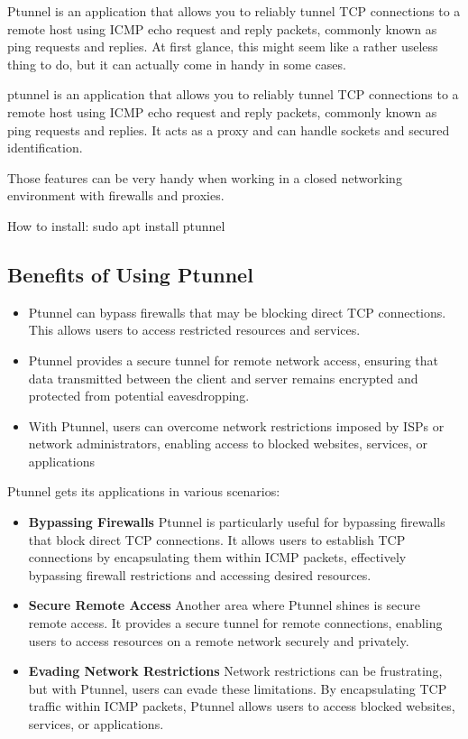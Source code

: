 Ptunnel is an application that allows you to reliably tunnel TCP connections to a remote host using ICMP echo request and reply packets, commonly known as ping requests and replies. At first glance, this might seem like a rather useless thing to do, but it can actually come in handy in some cases.

ptunnel is an application that allows you to reliably tunnel TCP connections to a remote host using ICMP echo request and reply packets, commonly known as ping requests and replies. It acts as a proxy and can handle sockets and secured identification.

Those features can be very handy when working in a closed networking environment with firewalls and proxies.

How to install: sudo apt install ptunnel
%
\subsection{Benefits of Using Ptunnel}
\begin{itemize}
    \item Ptunnel can bypass firewalls that may be blocking direct TCP connections. This allows users to access restricted resources and services.
    \item Ptunnel provides a secure tunnel for remote network access, ensuring that data transmitted between the client and server remains encrypted and protected from potential eavesdropping.
    \item With Ptunnel, users can overcome network restrictions imposed by ISPs or network administrators, enabling access to blocked websites, services, or applications
\end{itemize}
%
Ptunnel gets its applications in various scenarios:
\begin{itemize}
    \item \textbf{Bypassing Firewalls}
    Ptunnel is particularly useful for bypassing firewalls that block direct TCP connections. It allows users to establish TCP connections by encapsulating them within ICMP packets, effectively bypassing firewall restrictions and accessing desired resources.
    \item \textbf{Secure Remote Access} 
    Another area where Ptunnel shines is secure remote access. It provides a secure tunnel for remote connections, enabling users to access resources on a remote network securely and privately.
    \item \textbf{Evading Network Restrictions} 
    Network restrictions can be frustrating, but with Ptunnel, users can evade these limitations. By encapsulating TCP traffic within ICMP packets, Ptunnel allows users to access blocked websites, services, or applications.
\end{itemize}


